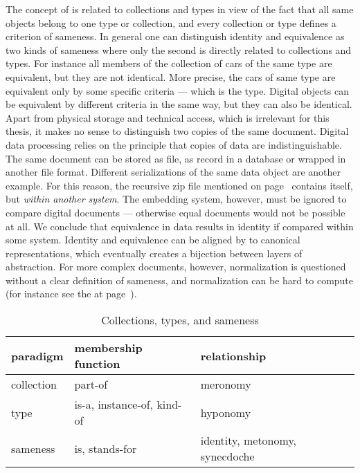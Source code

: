 The concept of  is related to collections and types in view of
the fact that all same objects belong to one type or collection, and every
collection or type defines a criterion of sameness. In general one can distinguish
identity and equivalence as two kinds of sameness where only the second is
directly related to collections and types. For instance all members of the
collection of cars of the same type are equivalent, but they are not identical.
More precise, the cars of same type are equivalent only by some specific
criteria --- which is the type. Digital objects can be equivalent by different
criteria in the same way, but they can also be identical. Apart from physical
storage and technical access, which is irrelevant for this thesis, it makes no
sense to distinguish two copies of the same document. Digital data processing
relies on the principle that copies of data are indistinguishable.  The same
document can be stored as file, as record in a database or wrapped in another
file format. Different serializations of the same data object are another
example. For this reason, the recursive zip file mentioned on
page~\pageref{p:zipfile} \cite{Cox2010} contains itself, but {\em within
another system}. The embedding system, however, must be ignored to compare
digital documents --- otherwise equal documents would not be possible at all.
We conclude that equivalence in data results in identity if compared within
some system.  Identity and equivalence can be aligned by 
to canonical representations, which eventually creates a bijection between
layers of abstraction. For more complex documents, however, normalization is
questioned \cite{Renear2003} without a clear definition of sameness, and
normalization can be hard to compute (for instance see the  at page~\pageref{fn:gi}). 

\begin{table}
\centering
\begin{tabular}{|lll|}
\hline
\textbf{paradigm} & 
\textbf{membership function} &
\textbf{relationship} \\
\hline
collection & part-of & meronomy \\
type       & is-a, instance-of, kind-of & hyponomy \\
sameness   & is, stands-for & identity, metonomy, synecdoche \\
\hline
\end{tabular}
\caption{Collections, types, and sameness}
\label{tab:coltypes}
\end{table}

